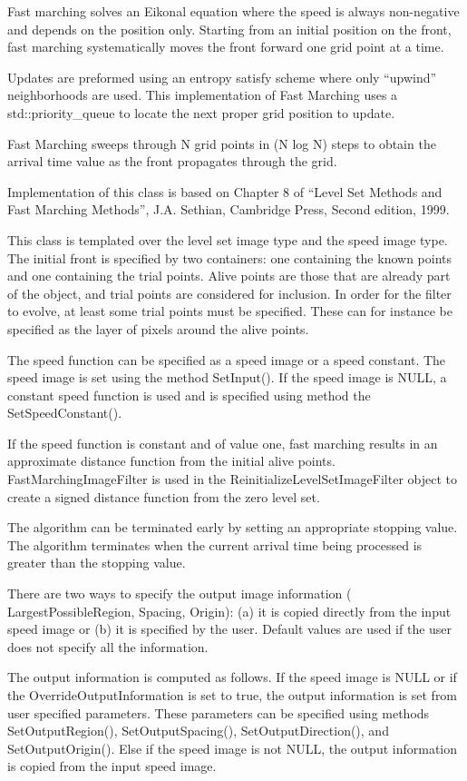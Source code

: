 \documentclass{article}
\begin{document}
Fast marching solves an Eikonal equation where the speed is always non-negative and depends on the position only. Starting from an initial position on the front, fast marching systematically moves the front forward one grid point at a time.


Updates are preformed using an entropy satisfy scheme where only ``upwind'' neighborhoods are used. This implementation of Fast Marching uses a std::priority\_queue to locate the next proper grid position to update.


Fast Marching sweeps through N grid points in (N log N) steps to obtain the arrival time value as the front propagates through the grid.


Implementation of this class is based on Chapter 8 of ``Level Set Methods and Fast Marching Methods'', J.A. Sethian, Cambridge Press, Second edition, 1999.


This class is templated over the level set image type and the speed image type. The initial front is specified by two containers: one containing the known points and one containing the trial points. Alive points are those that are already part of the object, and trial points are considered for inclusion. In order for the filter to evolve, at least some trial points must be specified. These can for instance be specified as the layer of pixels around the alive points.


The speed function can be specified as a speed image or a speed constant. The speed image is set using the method SetInput(). If the speed image is NULL, a constant speed function is used and is specified using method the SetSpeedConstant().


If the speed function is constant and of value one, fast marching results in an approximate distance function from the initial alive points. FastMarchingImageFilter is used in the ReinitializeLevelSetImageFilter object to create a signed distance function from the zero level set.


The algorithm can be terminated early by setting an appropriate stopping value. The algorithm terminates when the current arrival time being processed is greater than the stopping value.


There are two ways to specify the output image information ( LargestPossibleRegion, Spacing, Origin): (a) it is copied directly from the input speed image or (b) it is specified by the user. Default values are used if the user does not specify all the information.


The output information is computed as follows. If the speed image is NULL or if the OverrideOutputInformation is set to true, the output information is set from user specified parameters. These parameters can be specified using methods SetOutputRegion(), SetOutputSpacing(), SetOutputDirection(), and SetOutputOrigin(). Else if the speed image is not NULL, the output information is copied from the input speed image.
\end{document}

